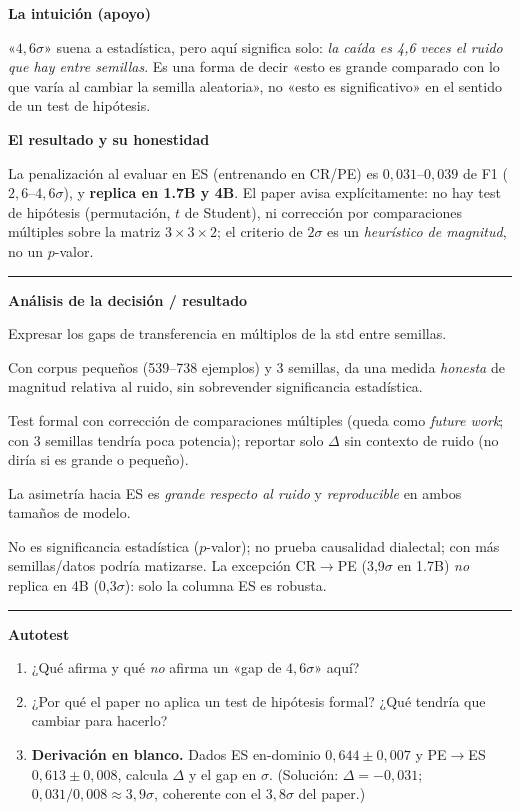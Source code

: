 \documentclass[11pt,a4paper]{article}
\newcommand{\nivel}[1]{\medskip\noindent\textbf{\textcolor{blue!45!black}{#1}}\par\nopagebreak\smallskip}
\newenvironment{analisis}{%
  \medskip\par\noindent\rule{\linewidth}{0.4pt}\par\nopagebreak
  \textbf{Análisis de la decisión / resultado}\par\nopagebreak\smallskip
  \begin{description}[leftmargin=2.6cm,style=nextline,font=\bfseries]
}{%
  \end{description}\noindent\rule{\linewidth}{0.4pt}\par\medskip
}
\begin{document}
\nivel{La intuición (apoyo)}
«$4{,}6\sigma$» suena a estadística, pero aquí significa solo: \emph{la caída es 4,6 veces el ruido
que hay entre semillas}. Es una forma de decir «esto es grande comparado con lo que varía al cambiar
la semilla aleatoria», no «esto es significativo» en el sentido de un test de hipótesis.

\nivel{El resultado y su honestidad}
La penalización al evaluar en ES (entrenando en CR/PE) es $0{,}031$--$0{,}039$ de F1
($2{,}6$--$4{,}6\sigma$), y \textbf{replica en 1.7B y 4B}. El paper avisa explícitamente: no hay test
de hipótesis (permutación, $t$ de Student), ni corrección por comparaciones múltiples sobre la
matriz $3\times3\times2$; el criterio de $2\sigma$ es un \emph{heurístico de magnitud}, no un
$p$-valor.

\begin{analisis}
  \item[Qué] Expresar los gaps de transferencia en múltiplos de la std entre semillas.
  \item[Por qué] Con corpus pequeños (539--738 ejemplos) y 3 semillas, da una medida \emph{honesta}
        de magnitud relativa al ruido, sin sobrevender significancia estadística.
  \item[Alternativas descartadas] Test formal con corrección de comparaciones múltiples (queda como
        \emph{future work}; con 3 semillas tendría poca potencia); reportar solo $\Delta$ sin
        contexto de ruido (no diría si es grande o pequeño).
  \item[Qué significa] La asimetría hacia ES es \emph{grande respecto al ruido} y \emph{reproducible}
        en ambos tamaños de modelo.
  \item[Qué NO significa] No es significancia estadística ($p$-valor); no prueba causalidad
        dialectal; con más semillas/datos podría matizarse. La excepción CR$\to$PE (3,9$\sigma$ en
        1.7B) \emph{no} replica en 4B (0,3$\sigma$): solo la columna ES es robusta.
\end{analisis}

\nivel{Autotest}
\begin{enumerate}[nosep]
  \item ¿Qué afirma y qué \emph{no} afirma un «gap de $4{,}6\sigma$» aquí?
  \item ¿Por qué el paper no aplica un test de hipótesis formal? ¿Qué tendría que cambiar para
        hacerlo?
  \item \textbf{Derivación en blanco.} Dados ES en-dominio $0{,}644\pm0{,}007$ y PE$\to$ES
        $0{,}613\pm0{,}008$, calcula $\Delta$ y el gap en $\sigma$. (Solución: $\Delta=-0{,}031$;
        $0{,}031/0{,}008\approx 3{,}9\sigma$, coherente con el $3{,}8\sigma$ del paper.)
\end{enumerate}
\end{document}
